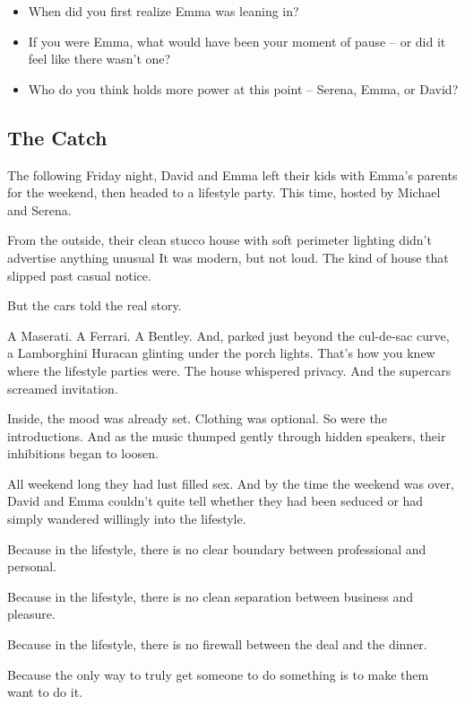 \begin{itemize}
  \item When did you first realize Emma was leaning in?
  \item If you were Emma, what would have been your moment of pause -- or did it feel like there wasn’t one?
  \item Who do you think holds more power at this point -- Serena, Emma, or David?
\end{itemize}







\subsection{The Catch}

The following Friday night, David and Emma left their kids with Emma's parents for the weekend,
then headed to a lifestyle party. This time, hosted by Michael and Serena.

From the outside, their clean stucco house with soft perimeter lighting didn’t advertise anything unusual
It was modern, but not loud. The kind of house that slipped past casual notice.

But the cars told the real story.

A Maserati. A Ferrari. A Bentley. And, parked just beyond the cul-de-sac curve, a Lamborghini Huracan glinting 
under the porch lights.
That’s how you knew where the lifestyle parties were. The house whispered privacy. And the supercars screamed 
invitation.

Inside, the mood was already set. Clothing was optional. So were the introductions.
And as the music thumped gently through hidden speakers, their inhibitions began to loosen.

All weekend long they had lust filled sex. And by the time the weekend was over, David and 
Emma couldn’t quite tell whether they had been seduced or had simply wandered willingly into the lifestyle.

Because in the lifestyle, there is no clear boundary between professional and personal.  

Because in the lifestyle, there is no clean separation between business and pleasure.  

Because in the lifestyle, there is no firewall between the deal and the dinner.

Because the only way to truly get someone to do something is to make them want to do it.

